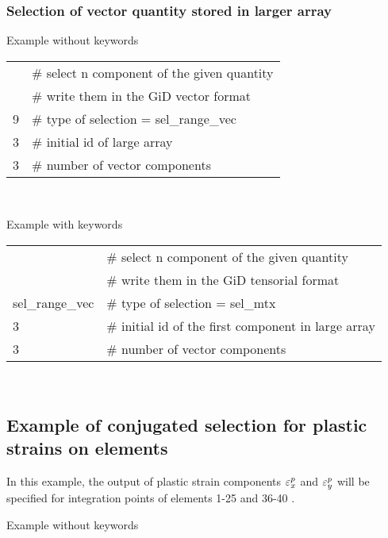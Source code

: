 \subsubsection{Selection of vector quantity stored in larger array}
\noindent Example without keywords
\begin{center}
\begin{tabular}{|ll|}
\hline
   & \# select n component of the given quantity \\
   & \# write them in the GiD vector format      \\
9  & \# type of selection = sel\_range\_vec      \\
3  & \# initial id of large array                \\
3  & \# number of vector components              \\
\hline
\end{tabular}\\
\end{center}
Example with keywords
\begin{center}
\begin{tabular}{|ll|}
\hline
                & \# select n component of the given quantity         \\
                & \# write them in the GiD tensorial format           \\
sel\_range\_vec & \# type of selection = sel\_mtx                     \\
3               & \# initial id of the first component in large array \\
3               & \# number of vector components                      \\
\hline
\end{tabular}\\
\end{center}

\subsection {Example of conjugated selection for plastic strains on elements} \label{consel_ex}
In this example, the output of plastic strain components $\varepsilon^p_x$ and $\varepsilon^p_y$ will 
be specified for integration points of elements 1-25 and 36-40 .

\vspace{3mm}
\noindent Example without keywords

